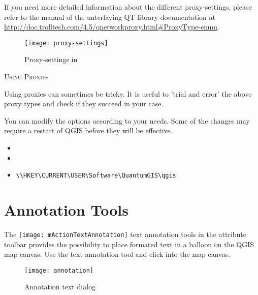 If you need more detailed information about the different proxy-settings,
please refer to the manual of the unterlaying QT-library-documentation at
\url{http://doc.trolltech.com/4.5/qnetworkproxy.html#ProxyType-enum}.

\begin{figure}[ht]
   \centering
   \texttt{[image: proxy-settings]}
   \caption{Proxy-settings in \qg \nixcaption}
   \label{fig:proxy-settings}
\end{figure}

\begin{Tip} \caption{\textsc{Using Proxies}}
Using proxies can sometimes be tricky. It is useful to 'trial and
error' the above proxy types and check if they succeed in your case.
\end{Tip}

You can modify the options according to your needs. Some of the changes may
require a restart of QGIS before they will be effective.

\begin{itemize}
\item {}
\item {}
\item {}
\begin{verbatim}
\\HKEY\CURRENT\USER\Software\QuantumGIS\qgis
\end{verbatim}
\end{itemize}

\section{Annotation Tools}\label{sec:annotations}

The \texttt{[image: mActionTextAnnotation]} text
annotation tools in the attribute toolbar provides the possibility to
place formated text in a balloon on the QGIS map canvas. Use the text
annotation tool and click into the map canvas.

\begin{figure}[ht]
   \centering
   \texttt{[image: annotation]}
   \caption{Annotation text dialog \nixcaption}
   \label{fig:annotation}
\end{figure}


